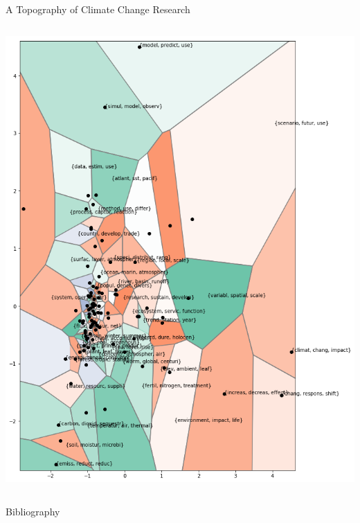 \documentclass[9pt]{beamer}
\begin{document}
\begin{frame}{A Topography of Climate Change Research}
\begin{columns}
\begin{column}{0.5\linewidth}
\begin{center}
\includegraphics[width=\linewidth]{../plots/pca_map_portrait}
		\end{center}
	\end{column}
\end{columns}
\end{frame}


\begin{frame}{Bibliography}
	\small
	
\end{frame}
\end{document}
